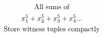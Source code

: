 \documentclass[preview]{standalone}
\begin{document}
\begin{gather*}
\special{dvisvgm:raw <g id='unique000'>}\text{All sums of} \\ x_1^5 + x_2^5 + x_3^5 + x_4^5... \\ \text{Store witness tuples compactly}\special{dvisvgm:raw </g>}
\end{gather*}
\end{document}
